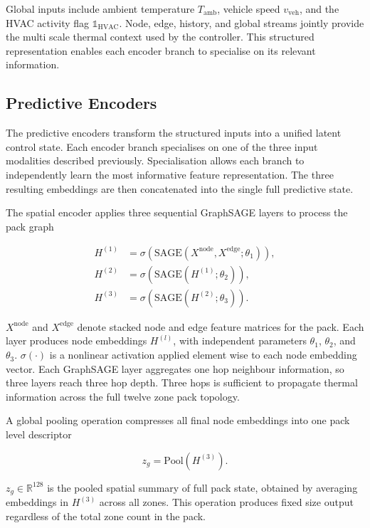 \documentclass[twocolumn]{article}
\begin{document}
Global inputs include ambient temperature $T_{\mathrm{amb}}$, vehicle speed $v_{\mathrm{veh}}$, and the HVAC activity flag $\mathbb{1}_{\mathrm{HVAC}}$. Node, edge, history, and global streams jointly provide the multi scale thermal context used by the controller. This structured representation enables each encoder branch to specialise on its relevant information.

\subsection*{Predictive Encoders}

The predictive encoders transform the structured inputs into a unified latent control state. Each encoder branch specialises on one of the three input modalities described previously. Specialisation allows each branch to independently learn the most informative feature representation. The three resulting embeddings are then concatenated into the single full predictive state.

The spatial encoder applies three sequential GraphSAGE layers to process the pack graph

\begin{align}
H^{(1)} &= \sigma(\mathrm{SAGE}(X^{\mathrm{node}}, X^{\mathrm{edge}}; \theta_1)),\\
H^{(2)} &= \sigma(\mathrm{SAGE}(H^{(1)}; \theta_2)),\\
H^{(3)} &= \sigma(\mathrm{SAGE}(H^{(2)}; \theta_3)).
\end{align}

$X^{\mathrm{node}}$ and $X^{\mathrm{edge}}$ denote stacked node and edge feature matrices for the pack. Each layer produces node embeddings $H^{(l)}$, with independent parameters $\theta_1$, $\theta_2$, and $\theta_3$. $\sigma(\cdot)$ is a nonlinear activation applied element wise to each node embedding vector. Each GraphSAGE layer aggregates one hop neighbour information, so three layers reach three hop depth. Three hops is sufficient to propagate thermal information across the full twelve zone pack topology.

A global pooling operation compresses all final node embeddings into one pack level descriptor

\begin{equation}
z_g = \mathrm{Pool}(H^{(3)}).
\end{equation}

$z_g \in \mathbb{R}^{128}$ is the pooled spatial summary of full pack state, obtained by averaging embeddings in $H^{(3)}$ across all zones. This operation produces fixed size output regardless of the total zone count in the pack.
\end{document}
